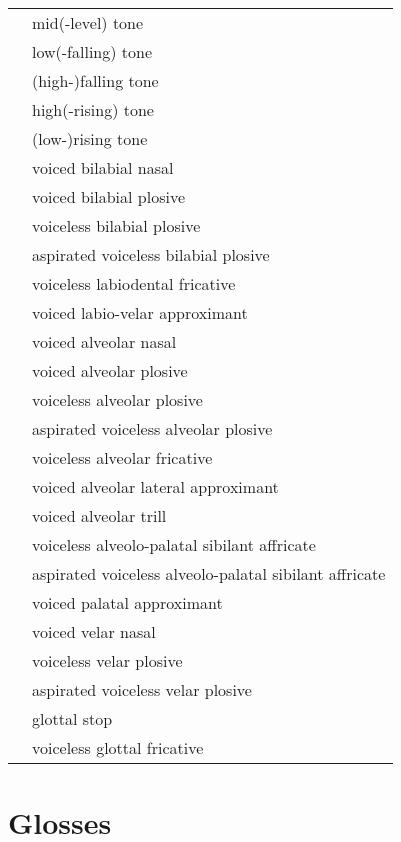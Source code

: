 \documentclass{article}
\begin{document}
\begin{xltabular}{\textwidth}{lL}
   & mid(-level) tone \\
   & low(-falling) tone \\
   & (high-)falling tone \\
   & high(-rising) tone \\
   & (low-)rising tone \\
   & voiced bilabial nasal \\
   & voiced bilabial plosive \\
   & voiceless bilabial plosive \\
   & aspirated voiceless bilabial plosive \\
   & voiceless labiodental fricative \\
   & voiced labio-velar approximant \\
   & voiced alveolar nasal \\
   & voiced alveolar plosive \\
   & voiceless alveolar plosive \\
   & aspirated voiceless alveolar plosive \\
   & voiceless alveolar fricative \\
   & voiced alveolar lateral approximant \\
   & voiced alveolar trill \\
  \ipa{\texttctclig} & voiceless alveolo-palatal sibilant affricate \\
   & aspirated voiceless alveolo-palatal sibilant affricate\\
   & voiced palatal approximant \\
   & voiced velar nasal \\
   & voiceless velar plosive \\
   & aspirated voiceless velar plosive \\
   & glottal stop \\
   & voiceless glottal fricative \\
\end{xltabular}

\newpage\section{Glosses}
\end{document}
